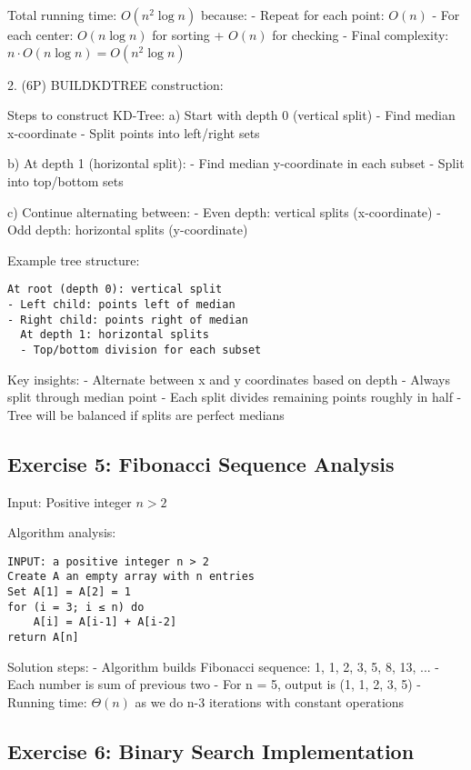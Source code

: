 Total running time: $O(n^2 \log n)$ because:
- Repeat for each point: $O(n)$
- For each center: $O(n \log n)$ for sorting + $O(n)$ for checking
- Final complexity: $n \cdot O(n \log n) = O(n^2 \log n)$

2. (6P) BUILDKDTREE construction:

Steps to construct KD-Tree:
a) Start with depth 0 (vertical split)
   - Find median x-coordinate
   - Split points into left/right sets

b) At depth 1 (horizontal split):
   - Find median y-coordinate in each subset
   - Split into top/bottom sets

c) Continue alternating between:
   - Even depth: vertical splits (x-coordinate)
   - Odd depth: horizontal splits (y-coordinate)

Example tree structure:
\begin{verbatim}
At root (depth 0): vertical split
- Left child: points left of median
- Right child: points right of median
  At depth 1: horizontal splits
  - Top/bottom division for each subset
\end{verbatim}

Key insights:
- Alternate between x and y coordinates based on depth
- Always split through median point
- Each split divides remaining points roughly in half
- Tree will be balanced if splits are perfect medians

\subsection*{Exercise 5: Fibonacci Sequence Analysis}

Input: Positive integer $n > 2$

Algorithm analysis:
\begin{verbatim}
INPUT: a positive integer n > 2
Create A an empty array with n entries
Set A[1] = A[2] = 1
for (i = 3; i ≤ n) do
    A[i] = A[i-1] + A[i-2]
return A[n]
\end{verbatim}

Solution steps:
- Algorithm builds Fibonacci sequence: 1, 1, 2, 3, 5, 8, 13, ...
- Each number is sum of previous two
- For n = 5, output is (1, 1, 2, 3, 5)
- Running time: $\Theta(n)$ as we do n-3 iterations with constant operations

\subsection*{Exercise 6: Binary Search Implementation}


